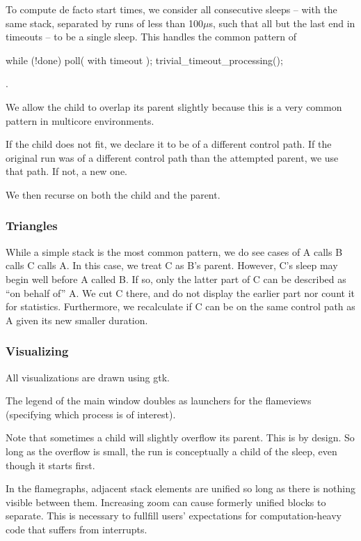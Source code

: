 \documentclass[10pt]{article}
\begin{document}
To compute de facto start times, we consider all consecutive sleeps -- with the same stack, separated by runs of less than 100$\mu$s, such that all but the last end in timeouts -- to be a single sleep.  This handles the common pattern of \begin{tt}while (!done) { poll( with timeout ); trivial\_timeout\_processing(); }\end{tt}.

We allow the child to overlap its parent slightly because this is a very common pattern in multicore environments.

If the child does not fit, we declare it to be of a different control path.  If the original run was of a different control path than the attempted parent, we use that path.  If not, a new one.

We then recurse on both the child and the parent. 

\subsubsection{Triangles}

While a simple stack is the most common pattern, we do see cases of A calls B calls C calls A.  In this case, we treat C as B's parent.  However, C's sleep may begin well before A called B.  If so, only the latter part of C can be described as ``on behalf of'' A.  We cut C there, and do not display the earlier part nor count it for statistics.  Furthermore, we recalculate if C can be on the same control path as A given its new smaller duration.

\subsubsection{Visualizing}

All visualizations are drawn using gtk.

The legend of the main window doubles as launchers for the flameviews (specifying which process is of interest).

Note that sometimes a child will slightly overflow its parent.  This is by design.  So long as the overflow is small, the run is conceptually a child of the sleep, even though it starts first.

In the flamegraphs, adjacent stack elements are unified so long as there is nothing visible between them.  Increasing zoom can cause formerly unified blocks to separate.  This is necessary to fullfill users' expectations for computation-heavy code that suffers from interrupts.
\end{document}
